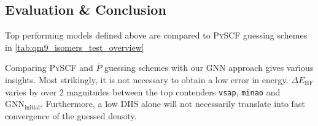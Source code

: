 \subsection{Evaluation \& Conclusion}
\label{subsec:qm9_isomers_eval_and_concl}
Top performing models defined above are compared to \textsc{PySCF} guessing schemes in \autoref{tab:qm9_isomers_test_overview}
\begin{table}[H]
    \centering
    \caption[Models compared to \textsc{PySCF} and $\overline{P}$ schemes -  Isomers]{Comparison of different models with \textsc{PySCF} and $\overline{P}$ guessing schemes for QM9 -  Isomers.}
    \label{tab:qm9_isomers_test_overview}
\end{table}
Comparing \textsc{PySCF} and $\overline{P}$ guessing schemes with our GNN approach gives various insights. Most strikingly, it is not necessary to obtain a low error in energy. $\Delta E_\text{HF}$ varies by over 2 magnitudes between the top contenders \texttt{vsap}, \texttt{minao} and $\text{GNN}_\text{initial}$. Furthermore, a low DIIS alone will not necessarily translate into fast convergence of the guessed density. \\

